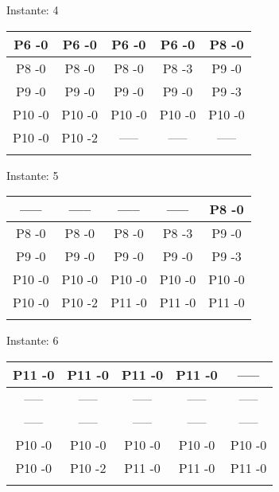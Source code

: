 \documentclass[10pt,a4paper]{article}
\begin{document}
\pagebreak
\begin{center}

Instante: 4

\hfill 
\hfill 
\hfill 
\break 
\begin{tabular}	{ccccc}
\hline  P6 -0 &   P6 -0 &   P6 -0 &   P6 -0 &   P8 -0 &  \\\hline  P8 -0 &   P8 -0 &   P8 -0 &   P8 -3 &   P9 -0 &  \\\hline  P9 -0 &   P9 -0 &   P9 -0 &   P9 -0 &   P9 -3 &  \\\hline  P10 -0 &   P10 -0 &   P10 -0 &   P10 -0 &   P10 -0 &  \\\hline  P10 -0 &   P10 -2 &   ----- &   ----- &   ----- &  \\\hfill 
\hfill 
\hfill 
\break 
\end{tabular}
\end{center}
\pagebreak
\begin{center}

Instante: 5

\hfill 
\hfill 
\hfill 
\break 
\begin{tabular}	{ccccc}
\hline  ----- &   ----- &   ----- &   ----- &   P8 -0 &  \\\hline  P8 -0 &   P8 -0 &   P8 -0 &   P8 -3 &   P9 -0 &  \\\hline  P9 -0 &   P9 -0 &   P9 -0 &   P9 -0 &   P9 -3 &  \\\hline  P10 -0 &   P10 -0 &   P10 -0 &   P10 -0 &   P10 -0 &  \\\hline  P10 -0 &   P10 -2 &   P11 -0 &   P11 -0 &   P11 -0 &  \\\hfill 
\hfill 
\hfill 
\break 
\end{tabular}
\end{center}
\pagebreak
\begin{center}

Instante: 6

\hfill 
\hfill 
\hfill 
\break 
\begin{tabular}	{ccccc}
\hline  P11 -0 &   P11 -0 &   P11 -0 &   P11 -0 &   ----- &  \\\hline  ----- &   ----- &   ----- &   ----- &   ----- &  \\\hline  ----- &   ----- &   ----- &   ----- &   ----- &  \\\hline  P10 -0 &   P10 -0 &   P10 -0 &   P10 -0 &   P10 -0 &  \\\hline  P10 -0 &   P10 -2 &   P11 -0 &   P11 -0 &   P11 -0 &  \\\hfill 
\hfill 
\hfill 
\break 
\end{tabular}
\end{center}
\end{document}
